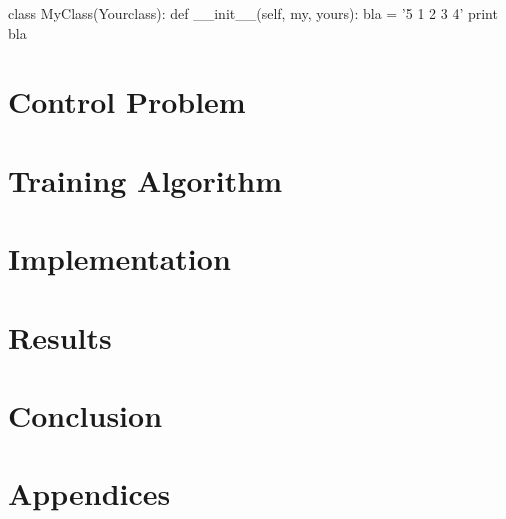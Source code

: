 \documentclass[12pt,letterpaper,titlepage]{report}
\begin{document}
\begin{python}
	class MyClass(Yourclass):
	def __init__(self, my, yours):
	bla = '5 1 2 3 4'
	print bla
\end{python}


\chapter{Control Problem}

\chapter{Training Algorithm}

\chapter{Implementation}

\chapter{Results}

\chapter{Conclusion}

\renewcommand\bibname{References}
\printbibliography
{}

\chapter*{Appendices}
\end{document}
